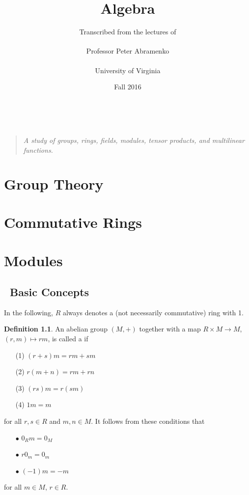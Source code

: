 \documentclass[11pt]{book}
\title{Algebra}
\author{ Transcribed from the lectures of \\ \ \\ Professor Peter Abramenko \\ \ \\ University of Virginia}
\date{Fall 2016}
\theoremstyle{definition}   \newtheorem{defn}[counter]{Definition} %
\DeclareMathOperator{\ra}{\rightarrow}   \DeclareMathOperator{\Poly}{\mathbf{P}}   \DeclareMathOperator{\spn}{\textnormal{span}}   \DeclareMathOperator{\aut}{\textnormal{Aut}}
\newcommand{\vs}{\vspace{8pt}}
\numberwithin{counter}{chapter}
\begin{document}
\frontmatter
\maketitle
\tableofcontents
\mainmatter

\ \vspace{100pt}
\begin{quote}
\centering
\textit{A study of groups, rings, fields, modules, tensor products, and multilinear functions.}
\end{quote}

\part{Group Theory}


\part{Commutative Rings}


\part{Modules}

\chapter{\null \quad \ Basic Concepts}

In the following, $R$ always denotes a (not necessarily commutative) ring with 1.

\vs

\begin{defn}
An abelian group $(M,+)$ together with a map $R \times M \ra M$, $(r,m) \mapsto rm$, is called a  if
\begin{enumerate}
\item[(1)] $(r+s)m = rm + sm$
\item[(2)] $r(m+n) = rm + rn$
\item[(3)] $(rs)m = r(sm)$
\item[(4)] $1 m = m$
\end{enumerate}
for all $r,s \in R$ and $m,n \in M$. It follows from these conditions that
\begin{enumerate}
\item[$\bullet$] $0_R m = 0_M$
\item[$\bullet$] $r0_m = 0_m$
\item[$\bullet$] $(-1)m = -m$
\end{enumerate}
for all $m \in M$, $r \in R$.
\end{defn}
\end{document}
